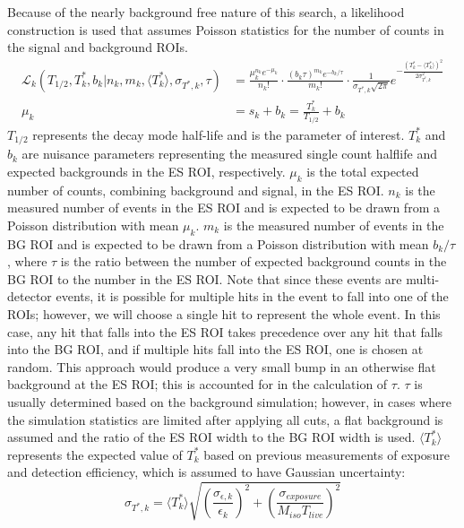 \documentclass[/main.tex]{subfiles}
\begin{document}
Because of the nearly background free nature of this search, a likelihood construction is used that assumes Poisson statistics for the number of counts in the signal and background ROIs.
\begin{equation}
  \label{eq:rolke}
  \begin{aligned}
    \mathcal{L}_k(T_{1/2},T^*_k,b_k|n_k,m_k,\langle T^*_k\rangle, \sigma_{T^*,k},\tau)
    &=\frac{\mu_k^{n_k}e^{-\mu_k}}{n_k!} \cdot \frac{(b_k\tau)^{m_k}e^{-b_k/\tau}}{m_k!} \cdot
    \frac{1}{\sigma_{T^*,k}\sqrt{2\pi}}e^{-\frac{(T^*_k-\langle T^*_k\rangle)^2}{2\sigma_{T^*,k}^2}} \\
    \mu_k &= s_k+b_k = \frac{T^*_k}{T_{1/2}} + b_k
  \end{aligned}
\end{equation}
$T_{1/2}$ represents the decay mode half-life and is the parameter of interest.
$T^*_k$ and $b_k$ are nuisance parameters representing the measured single count halflife and expected backgrounds in the ES ROI, respectively.
$\mu_k$ is the total expected number of counts, combining background and signal, in the ES ROI.
$n_k$ is the measured number of events in the ES ROI and is expected to be drawn from a Poisson distribution with mean $\mu_k$.
$m_k$ is the measured number of events in the BG ROI and is expected to be drawn from a Poisson distribution with mean $b_k/\tau$, where $\tau$ is the ratio between the number of expected background counts in the BG ROI to the number in the ES ROI.
Note that since these events are multi-detector events, it is possible for multiple hits in the event to fall into one of the ROIs; however, we will choose a single hit to represent the whole event.
In this case, any hit that falls into the ES ROI takes precedence over any hit that falls into the BG ROI, and if multiple hits fall into the ES ROI, one is chosen at random.
This approach would produce a very small bump in an otherwise flat background at the ES ROI; this is accounted for in the calculation of $\tau$.
$\tau$ is usually determined based on the background simulation; however, in cases where the simulation statistics are limited after applying all cuts, a flat background is assumed and the ratio of the ES ROI width to the BG ROI width is used.
$\langle T^*_k\rangle$ represents the expected value of $T^*_k$ based on previous measurements of exposure and detection efficiency, which is assumed to have Gaussian uncertainty:
\begin{equation}
  \sigma_{T^*,k} = \langle T^*_k\rangle\sqrt{(\frac{\sigma_{\epsilon,k}}{\epsilon_k })^2 + (\frac{\sigma_{exposure}}{M_{iso}T_{live} })^2}
\end{equation}
\end{document}
